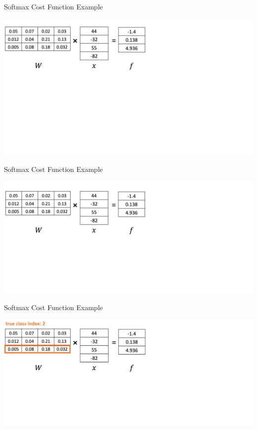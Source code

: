 \documentclass{beamer}
\begin{document}
\begin{frame}{Softmax Cost Function Example}
\begin{center}
\includegraphics[width=1.05\textwidth]{softmax_example1}
\end{center}
\end{frame}

\begin{frame}{Softmax Cost Function Example}
\begin{center}
\includegraphics[width=1.05\textwidth]{softmax_example2}
\end{center}
\end{frame}


\begin{frame}{Softmax Cost Function Example}
\begin{center}
\includegraphics[width=1.05\textwidth]{softmax_example3}
\end{center}
\end{frame}
\end{document}
